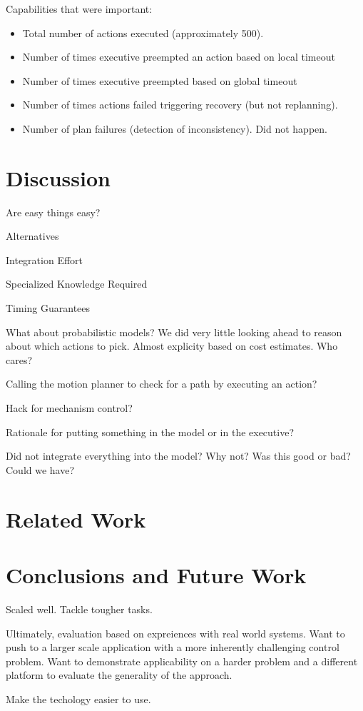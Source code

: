 \documentclass[letterpaper]{article}
\begin{document}
Capabilities that were important:
\begin{itemize}
\item Total number of actions executed (approximately 500).
\item Number of times executive preempted an action based on local timeout
\item Number of times executive preempted based on global timeout
\item Number of times actions failed triggering recovery (but not replanning).
\item Number of plan failures (detection of inconsistency). Did not happen.
\end{itemize}

\section{Discussion}

Are easy things easy?

Alternatives

Integration Effort

Specialized Knowledge Required

Timing Guarantees

What about probabilistic models? We did very little looking ahead to reason about which actions to pick. Almost explicity based on cost estimates. Who cares?

Calling the motion planner to check for a path by executing an action?

Hack for mechanism control?

Rationale for putting something in the model or in the executive?

Did not integrate everything into the model? Why not? Was this good or bad? Could we have?

\section{Related Work}

\section{Conclusions and Future Work}
Scaled well.
Tackle tougher tasks.

Ultimately, evaluation based on expreiences with real world systems. Want to push to a larger scale application with a more inherently challenging control problem. Want to demonstrate applicability on a harder problem and a different platform to evaluate the generality of the approach.

Make the techology easier to use.
\end{document}
